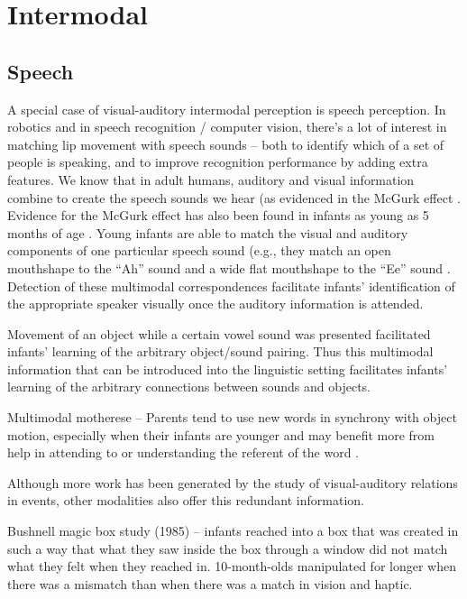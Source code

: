 \section{Intermodal}







\subsection{Speech}

A special case of visual-auditory intermodal perception is speech
perception.  
%
In robotics and in speech recognition / computer vision, there's
a lot of interest in matching lip movement with speech sounds --
both to identify which of a set of people is speaking, and to
improve recognition performance by adding extra features.
%
We know that in adult humans, auditory and visual
information combine to create the speech sounds we hear (as evidenced
in the McGurk effect \cite{mcgurk76hearing}.  Evidence for the
McGurk effect has also been found in infants as young as 5 months of
age \cite{rosenblum97mcgurk}.  Young infants are able
to match the visual and auditory components of one particular speech
sound (e.g., they match an open mouthshape to the ``Ah'' sound and a
wide flat mouthshape to the ``Ee'' sound \cite{kuhl82bimodal}.
Detection of these multimodal correspondences facilitate infants'
identification of the appropriate speaker visually once the auditory
information is attended.

Movement of an object while a certain vowel sound was presented
facilitated infants' learning of the arbitrary object/sound pairing.
Thus this multimodal information that can be introduced into the
linguistic setting facilitates infants' learning of the arbitrary
connections between sounds and objects.

Multimodal motherese -- Parents tend to use new words in synchrony
with object motion, especially when their infants are younger and may
benefit more from help in attending to or understanding the referent
of the word \cite{gogate00study}.



Although more work has been generated by the study of visual-auditory
relations in events, other modalities also offer this redundant
information.

Bushnell magic box study (1985) -- infants reached into a box
that was created in such a way that what they saw inside the box
through a window did not match what they felt when they reached in.
10-month-olds manipulated for longer when there was a mismatch than
when there was a match in vision and haptic.



